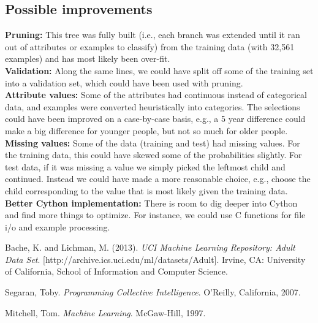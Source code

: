 \documentclass{article}
\begin{document}
\subsection{Possible improvements}
\textbf{Pruning:} This tree was fully built (i.e., each branch was extended until it ran out of attributes or examples to classify) from the training data (with 32,561 examples) and has most likely been over-fit. \\

\textbf{Validation:} Along the same lines, we could have split off some of the training set into a validation set, which could have been used with pruning. \\ 

\textbf{Attribute values:} Some of the attributes had continuous instead of categorical data, and examples were converted heuristically into categories. The selections could have been improved on a case-by-case basis, e.g., a 5 year difference could make a big difference for younger people, but not so much for older people.\\

\textbf{Missing values:} Some of the data (training and test) had missing values. For the training data, this could have skewed some of the probabilities slightly. For test data, if it was missing a value we simply picked the leftmost child and continued. Instead we could have made a more reasonable choice, e.g., choose the child corresponding to the value that is most likely given the training data.\\

\textbf{Better Cython implementation:} There is room to dig deeper into Cython and find more things to optimize. For instance, we could use C functions for file i/o and example processing.


\begin{thebibliography}{9}

Bache, K. and Lichman, M. (2013). \textsl{UCI Machine Learning Repository: Adult Data Set}. [http://archive.ics.uci.edu/ml/datasets/Adult]. Irvine, CA: University of California, School of Information and Computer Science.

Segaran, Toby. \textsl{Programming Collective Intelligence}. O'Reilly, California, 2007.

Mitchell, Tom. \textsl{Machine Learning}. McGaw-Hill, 1997.

\end{thebibliography}
\end{document}
